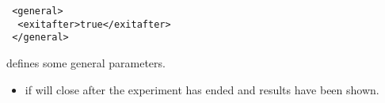      



\begin{lstlisting}
 <general>
  <exitafter>true</exitafter>
 </general>
\end{lstlisting}

 defines some general parameters.

\begin{itemize}
\item {} if  \apex will close after the experiment has ended and results have been shown.
\end{itemize}

